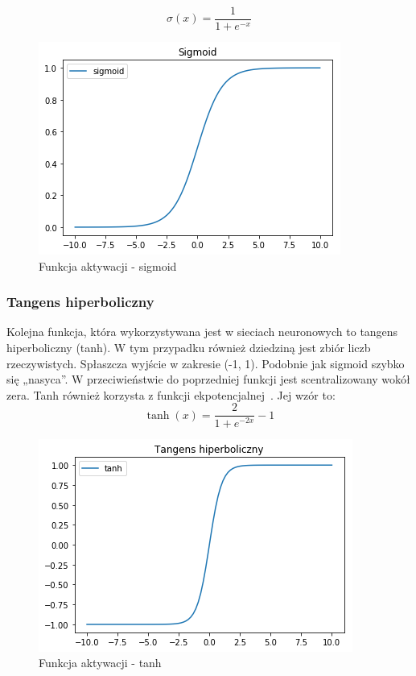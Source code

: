     \begin{equation}
        \sigma(x) = \frac {1}{1+e^{-x}}
    \end{equation}

    \begin{figure}[htp]
        \centering
        \includegraphics[scale=0.8]{./img/sigmoid.png}
        \caption{Funkcja aktywacji - sigmoid}
    \end{figure}

    \subsubsection{Tangens hiperboliczny}
    Kolejna funkcja, która wykorzystywana jest w sieciach neuronowych to tangens hiperboliczny (tanh).
    W tym przypadku również dziedziną jest zbiór liczb rzeczywistych.
    Spłaszcza wyjście w zakresie (-1, 1).
    Podobnie jak sigmoid szybko się „nasyca”.
    W przeciwieństwie do poprzedniej funkcji jest scentralizowany wokół zera.
    Tanh również korzysta z funkcji ekpotencjalnej~\cite{cs231_neural_2}.
    Jej wzór to:
    \begin{equation}
        \tanh(x) = \frac {2}{1+e^{-2x}} - 1
    \end{equation}

    \begin{figure}[htp]
        \centering
        \includegraphics[scale=0.8]{./img/tanh.png}
        \caption{Funkcja aktywacji - tanh}
    \end{figure}

